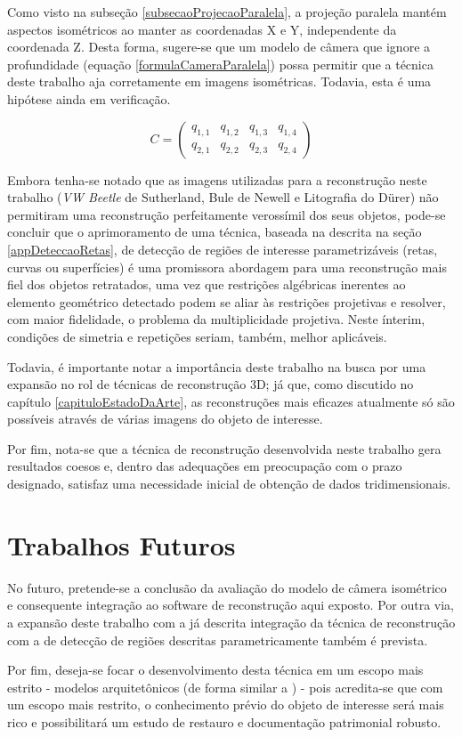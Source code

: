 			Como visto na subseção \ref{subsecaoProjecaoParalela}, a projeção paralela mantém aspectos isométricos ao manter as coordenadas X e Y, independente da coordenada Z. Desta forma, sugere-se que um modelo de câmera que ignore a profundidade (equação \ref{formulaCameraParalela}) possa permitir que a técnica deste trabalho aja corretamente em imagens isométricas. Todavia, esta é uma hipótese ainda em verificação.
			
			\begin{equation}
				\label{formulaCameraParalela}
				C = \begin{pmatrix}
						q_{1,1} & q_{1,2} & q_{1,3} & q_{1,4} \\
						q_{2,1} & q_{2,2} & q_{2,3} & q_{2,4}
					\end{pmatrix}
			\end{equation}
			
			Embora tenha-se notado que as imagens utilizadas para a reconstrução neste trabalho (\textit{VW Beetle} de Sutherland, Bule de Newell e Litografia do Dürer) não permitiram uma reconstrução perfeitamente verossímil dos seus objetos, pode-se concluir que o aprimoramento de uma técnica, baseada na descrita na seção \ref{appDeteccaoRetas}, de detecção de regiões de interesse parametrizáveis (retas, curvas ou superfícies) é uma promissora abordagem para uma reconstrução mais fiel dos objetos retratados, uma vez que restrições algébricas inerentes ao elemento geométrico detectado podem se aliar às restrições projetivas e resolver, com maior fidelidade, o problema da multiplicidade projetiva. Neste ínterim, condições de simetria e repetições seriam, também, melhor aplicáveis.
			
			Todavia, é importante notar a importância deste trabalho na busca por uma expansão no rol de técnicas de reconstrução 3D; já que, como discutido no capítulo \ref{capituloEstadoDaArte}, as reconstruções mais eficazes atualmente só são possíveis através de várias imagens do objeto de interesse.
			
			Por fim, nota-se que a técnica de reconstrução desenvolvida neste trabalho gera resultados coesos e, dentro das adequações em preocupação com o prazo designado, satisfaz uma necessidade inicial de obtenção de dados tridimensionais.
			
		\section{Trabalhos Futuros}
			\label{secaoTrabalhosFuturos}
			
			No futuro, pretende-se a conclusão da avaliação do modelo de câmera isométrico e consequente integração ao software de reconstrução aqui exposto. Por outra via, a expansão deste trabalho com a já descrita integração da técnica de reconstrução com a de detecção de regiões descritas parametricamente também é prevista. 
			
			Por fim, deseja-se focar o desenvolvimento desta técnica em um escopo mais estrito -  modelos arquitetônicos (de forma similar a \cite{3DFromLineDrawings}) - pois acredita-se que com um escopo mais restrito, o conhecimento prévio do objeto de interesse será mais rico e possibilitará um estudo de restauro e documentação patrimonial robusto.